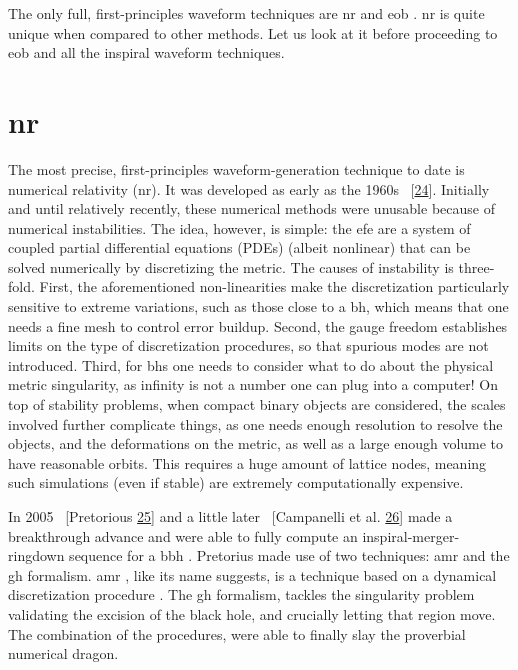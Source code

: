 \documentclass[
  11pt,
  a4paper,
  DIV=11,
  numbers=noendperiod,
  twoside]{scrreprt}
\DeclareRobustCommand{\[}{\begin{equation}}
\DeclareRobustCommand{\]}{\end{equation}}
\begin{document}
The only full, first-principles waveform techniques are \gls{nr} and
\gls{eob} . \gls{nr} is quite unique when
compared to other methods. Let us look at it before proceeding to
\gls{eob} and all the inspiral waveform techniques.

\hypertarget{nr}{%
\section{\texorpdfstring{\acrlong{nr}}{}}\label{nr}}

The most precise, first-principles waveform-generation technique to date
is numerical relativity (\acrfull{nr}). It was developed as early as the
1960s ~{[}\protect\hyperlink{ref-hahn:1964}{24}{]}. Initially and until
relatively recently, these numerical methods were unusable because of
numerical instabilities. The idea, however, is simple: the \gls{efe} are
a system of coupled partial differential equations (PDEs) (albeit
nonlinear) that can be solved numerically by discretizing the metric.
The causes of instability is three-fold. First, the aforementioned
non-linearities make the discretization particularly sensitive to
extreme variations, such as those close to a \gls{bh}, which means that
one needs a fine mesh to control error buildup. Second, the gauge
freedom establishes limits on the type of discretization procedures, so
that spurious modes are not introduced. Third, for \glspl{bh} one needs
to consider what to do about the physical metric singularity, as
infinity is not a number one can plug into a computer! On top of
stability problems, when compact binary objects are considered, the
scales involved further complicate things, as one needs enough
resolution to resolve the objects, and the deformations on the metric,
as well as a large enough volume to have reasonable orbits. This
requires a huge amount of lattice nodes, meaning such simulations (even
if stable) are extremely computationally expensive.

In 2005 ~{[}Pretorious \protect\hyperlink{ref-Pretorius:2005gq}{25}{]}
and a little later ~{[}Campanelli et al.
\protect\hyperlink{ref-Campanelli:2005dd}{26}{]} made a breakthrough
advance and were able to fully compute an inspiral-merger-ringdown
sequence for a \gls{bbh} . Pretorius made use of two techniques:
\gls{amr} and the \gls{gh} formalism. \gls{amr} , like its name
suggests, is a technique based on a dynamical discretization procedure .
The \gls{gh} formalism, tackles the singularity problem validating the
excision of the black hole, and crucially letting that region move. The
combination of the procedures, were able to finally slay the proverbial
numerical dragon.
\end{document}
